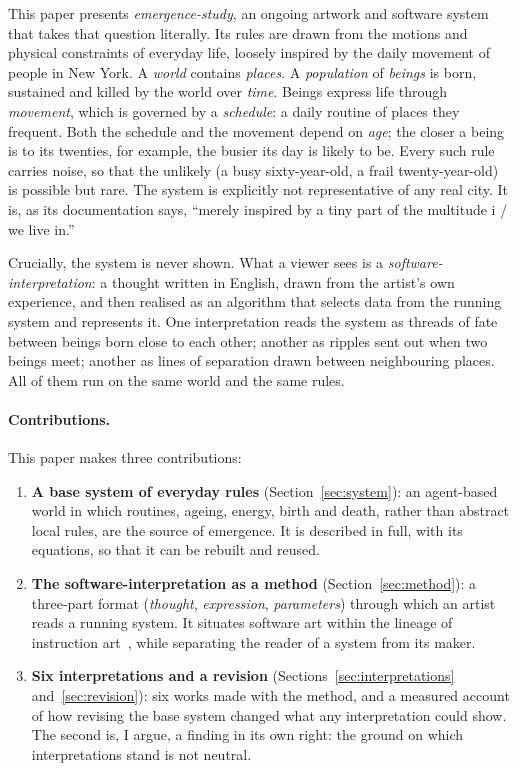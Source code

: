 This paper presents \emph{emergence-study}, an ongoing artwork and software system that takes that question literally. Its rules are drawn from the motions and physical constraints of everyday life, loosely inspired by the daily movement of people in New York. A \emph{world} contains \emph{places}. A \emph{population} of \emph{beings} is born, sustained and killed by the world over \emph{time}. Beings express life through \emph{movement}, which is governed by a \emph{schedule}: a daily routine of places they frequent. Both the schedule and the movement depend on \emph{age}; the closer a being is to its twenties, for example, the busier its day is likely to be. Every such rule carries noise, so that the unlikely (a busy sixty-year-old, a frail twenty-year-old) is possible but rare. The system is explicitly not representative of any real city. It is, as its documentation says, ``merely inspired by a tiny part of the multitude i / we live in.''

Crucially, the system is never shown. What a viewer sees is a \emph{software-interpretation}: a thought written in English, drawn from the artist's own experience, and then realised as an algorithm that selects data from the running system and represents it. One interpretation reads the system as threads of fate between beings born close to each other; another as ripples sent out when two beings meet; another as lines of separation drawn between neighbouring places. All of them run on the same world and the same rules.

\paragraph{Contributions.} This paper makes three contributions:
\begin{enumerate}[leftmargin=1.5em, itemsep=0.2em]
  \item \textbf{A base system of everyday rules} (Section~\ref{sec:system}): an agent-based world in which routines, ageing, energy, birth and death, rather than abstract local rules, are the source of emergence. It is described in full, with its equations, so that it can be rebuilt and reused.
  \item \textbf{The software-interpretation as a method} (Section~\ref{sec:method}): a three-part format (\emph{thought}, \emph{expression}, \emph{parameters}) through which an artist reads a running system. It situates software art within the lineage of instruction art~\cite{lewitt1967, ono1964}, while separating the reader of a system from its maker.
  \item \textbf{Six interpretations and a revision} (Sections~\ref{sec:interpretations} and~\ref{sec:revision}): six works made with the method, and a measured account of how revising the base system changed what any interpretation could show. The second is, I argue, a finding in its own right: the ground on which interpretations stand is not neutral.
\end{enumerate}

